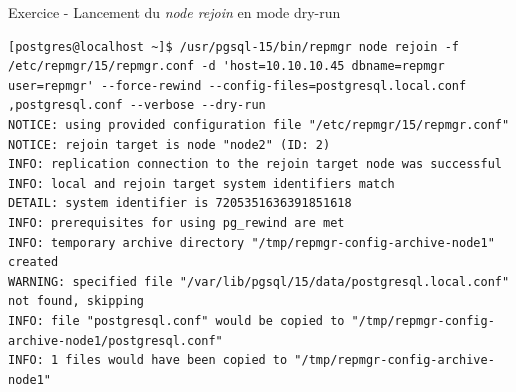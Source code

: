 \begin{frame}[fragile]{Exercice - Lancement du \textit{node rejoin} en mode dry-run}

   \begin{itemize}
\begin{tiny}
\begin{Verbatim}[commandchars=\&\{\}]
[postgres@localhost ~]$ /usr/pgsql-15/bin/repmgr node rejoin -f /etc/repmgr/15/repmgr.conf -d 'host=10.10.10.45 dbname=repmgr user=repmgr' --force-rewind --config-files=postgresql.local.conf
,postgresql.conf --verbose --dry-run                                                                                                                                                          
NOTICE: using provided configuration file "/etc/repmgr/15/repmgr.conf"                                                                                                                        
NOTICE: rejoin target is node "node2" (ID: 2)                                                                                                                                                 
INFO: replication connection to the rejoin target node was successful                                                                                                                         
INFO: local and rejoin target system identifiers match                                                                                                                                        
DETAIL: system identifier is 7205351636391851618                                                                                                                                              
INFO: prerequisites for using pg_rewind are met                                                                                                                                               
INFO: temporary archive directory "/tmp/repmgr-config-archive-node1" created                                                                                                                  
WARNING: specified file "/var/lib/pgsql/15/data/postgresql.local.conf" not found, skipping                                                                                                    
INFO: file "postgresql.conf" would be copied to "/tmp/repmgr-config-archive-node1/postgresql.conf"                                                                                            
INFO: 1 files would have been copied to "/tmp/repmgr-config-archive-node1"                                                                                                                    

\end{Verbatim}
\end{tiny}
\end{itemize}
\end{frame}

